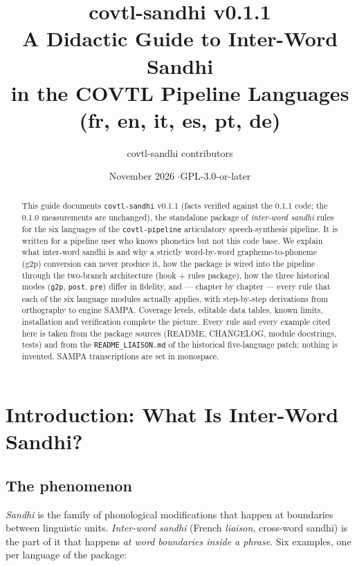 \documentclass[11pt,a4paper]{report}
\title{\textbf{covtl-sandhi v0.1.1}\\[2mm]
       \large A Didactic Guide to Inter-Word Sandhi\\
       in the COVTL Pipeline Languages (fr, en, it, es, pt, de)}
\author{covtl-sandhi contributors}
\date{November 2026 \quad$\cdot$\quad GPL-3.0-or-later}
\newcommand{\smp}[1]{\texttt{#1}}          %
\newcommand{\pkg}{\texttt{covtl-sandhi}}
\newcommand{\pipe}{\texttt{covtl-pipeline}}
\begin{document}
\maketitle

\begin{abstract}
\noindent
This guide documents \pkg{} v0.1.1 (facts verified against the 0.1.1 code; the 0.1.0 measurements are unchanged), the standalone package of
\emph{inter-word sandhi} rules for the six languages of the
\pipe{} articulatory speech-synthesis pipeline. It is written for a
pipeline user who knows phonetics but not this code base. We explain
what inter-word sandhi is and why a strictly word-by-word grapheme-to-phoneme
(g2p) conversion can never produce it, how the package is wired into the
pipeline through the two-branch architecture (hook + rules package), how the
three historical modes (\smp{g2p}, \smp{post}, \smp{pre}) differ in fidelity,
and — chapter by chapter — every rule that each of the six language modules
actually applies, with step-by-step derivations from orthography to engine
SAMPA. Coverage levels, editable data tables, known limits, installation and
verification complete the picture. Every rule and every example cited here is
taken from the package sources (README, CHANGELOG, module docstrings, tests)
and from the \smp{README\_LIAISON.md} of the historical five-language patch;
nothing is invented. SAMPA transcriptions are set in monospace.
\end{abstract}

\tableofcontents

\chapter{Introduction: What Is Inter-Word Sandhi?}

\section{The phenomenon}

\emph{Sandhi} is the family of phonological modifications that happen at
boundaries between linguistic units. \emph{Inter-word sandhi} (French
\emph{liaison}, cross-word sandhi) is the part of it that happens
\emph{at word boundaries inside a phrase}. Six examples, one per language of
the package:
\end{document}
